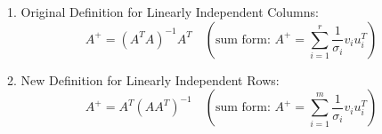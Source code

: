 \documentclass{article}
\begin{document}
1. Original Definition for Linearly Independent Columns:
\[
A^+ = (A^TA)^{-1}A^T \quad (\text{sum form: } A^+ = \sum_{i=1}^{r} \frac{1}{\sigma_i} v_i u_i^T)
\]

2. New Definition for Linearly Independent Rows:
\[
A^+ = A^T (AA^T)^{-1} \quad (\text{sum form: } A^+ = \sum_{i=1}^{m} \frac{1}{\sigma_i} v_i u_i^T)
\]




    
\end{document}
